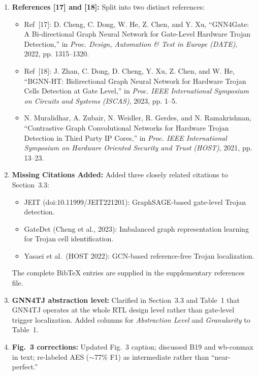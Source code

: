 \documentclass[11pt,a4paper]{article}
\begin{document}
\begin{enumerate}[leftmargin=*]
    \item[\textbf{M1.}] \textbf{References [17] and [18]:} Split into two distinct references:
    \begin{itemize}
        \item Ref~[17]: D. Cheng, C. Dong, W. He, Z. Chen, and Y. Xu, ``GNN4Gate: A Bi-directional Graph Neural Network for Gate-Level Hardware Trojan Detection,'' in \textit{Proc. Design, Automation \& Test in Europe (DATE)}, 2022, pp. 1315--1320.
        \item Ref~[18]: J. Zhan, C. Dong, D. Cheng, Y. Xu, Z. Chen, and W. He, ``BGNN-HT: Bidirectional Graph Neural Network for Hardware Trojan Cells Detection at Gate Level,'' in \textit{Proc. IEEE International Symposium on Circuits and Systems (ISCAS)}, 2023, pp. 1--5.
        \item N. Muralidhar, A. Zubair, N. Weidler, R. Gerdes, and N. Ramakrishnan, ``Contrastive Graph Convolutional Networks for Hardware Trojan Detection in Third Party IP Cores,'' in \textit{Proc. IEEE International Symposium on Hardware Oriented Security and Trust (HOST)}, 2021, pp. 13--23.
    \end{itemize}

    \item[\textbf{M2.}] \textbf{Missing Citations Added:} Added three closely related citations to Section~3.3:
    \begin{itemize}
        \item JEIT (doi:10.11999/JEIT221201): GraphSAGE-based gate-level Trojan detection.
        \item GateDet (Cheng et al., 2023): Imbalanced graph representation learning for Trojan cell identification.
        \item Yasaei et al.\ (HOST 2022): GCN-based reference-free Trojan localization.
    \end{itemize}
    The complete BibTeX entries are supplied in the supplementary references file.

    \item[\textbf{M3.}] \textbf{GNN4TJ abstraction level:} Clarified in Section~3.3 and Table~1 that GNN4TJ operates at the whole RTL design level rather than gate-level trigger localization. Added columns for \textit{Abstraction Level} and \textit{Granularity} to Table~1.

    \item[\textbf{M4.}] \textbf{Fig.\ 3 corrections:} Updated Fig.~3 caption; discussed B19 and wb-conmax in text; re-labeled AES ($\sim$77\% F1) as intermediate rather than ``near-perfect.''


\end{enumerate}
\end{document}
